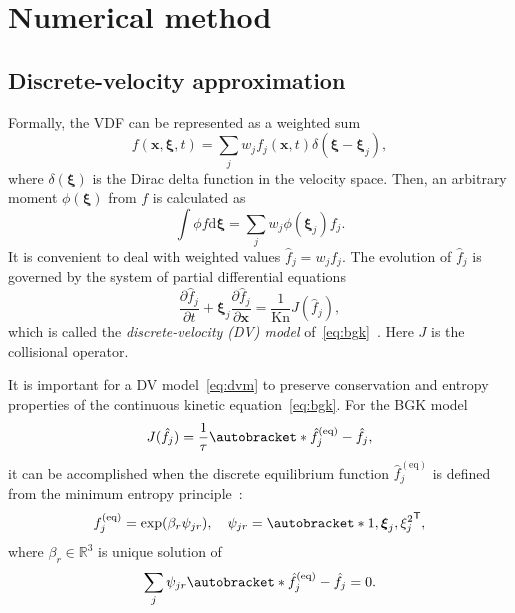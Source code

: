 \documentclass[]{elsarticle} %
\newcommand{\Kn}{\mathrm{Kn}}
\newcommand{\dd}{\mathrm{d}}
\newcommand{\pder}[2][]{\frac{\partial#1}{\partial#2}}
\newcommand{\transpose}[1]{#1^\mathsf{T}}
\DeclarePairedDelimiter\autobracket()       %
\newcommand{\br}[1]{\autobracket*{#1}}
\newcommand{\dxi}{\boldsymbol{\dd\xi}}
\newcommand{\bxi}{\boldsymbol{\xi}}
\newcommand{\bxia}{\bxi_j}
\newcommand{\bx}{\boldsymbol{x}}
\newcommand{\equil}[1]{#1^\mathrm{(eq)}}
\begin{document}
{\section{Numerical method}\label{sec:numerics}

\subsection{Discrete-velocity approximation}\label{sec:numerics:dv}

Formally, the VDF can be represented as a weighted sum
\begin{equation}\label{eq:discrete_velocity}
    f(\bx,\bxi,t) = \sum_j w_j f_j(\bx,t)\delta(\bxi-\bxi_j),
\end{equation}
where \(\delta(\bxi)\) is the Dirac delta function in the velocity space.
Then, an arbitrary moment \(\phi(\bxi)\) from \(f\) is calculated as
\begin{equation}\label{eq:cubature}
    \int \phi f\dxi = \sum_j w_j \phi(\bxi_j) f_j.
\end{equation}
It is convenient to deal with weighted values \(\hat{f}_j = w_jf_j\).
The evolution of \(\hat{f}_j\) is governed by the system of partial differential equations
\begin{equation}\label{eq:dvm}
    \pder[\hat{f}_j]{t} + \bxi_j\pder[\hat{f}_j]{\bx} = \frac{1}{\Kn}J(\hat{f}_j),
\end{equation}
which is called the \emph{discrete-velocity (DV) model} of~\eqref{eq:bgk}~\cite{Cabannes1980}.
Here $J$ is the collisional operator.

It is important for a DV model~\eqref{eq:dvm} to preserve conservation and entropy properties
of the continuous kinetic equation~\eqref{eq:bgk}.
For the BGK model
\begin{equation}\label{eq:dvm-bgk}
    J(\hat{f}_j) = \frac1\tau\br{\equil{\hat{f}}_j-\hat{f}_j},
\end{equation}
it can be accomplished when the discrete equilibrium function \(\equil{\hat{f}}_j\)
is defined from the minimum entropy principle~\cite{Mieussens2000}:
\begin{equation}\label{eq:equilibrium-bgk}
   \equil{f}_j = \exp(\beta_r\psi_{j r}), \quad
   \psi_{j r} = \transpose{\br{1,\bxia, \xi_j^2}},
\end{equation}
where \(\beta_r\in\mathbb{R}^{3}\) is unique solution of
\begin{equation}\label{eq:beta}
   \sum_j\psi_{j r}\br{\equil{\hat{f}}_j - \hat{f}_j} = 0.
\end{equation}

}
\end{document}
